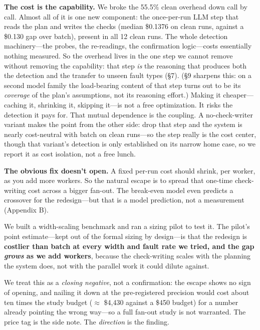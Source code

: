 \documentclass[acmsmall,screen]{acmart}
\begin{document}
\textbf{The cost is the capability.} We broke the 55.5\% clean overhead down
call by call. Almost all of it is one new component: the once-per-run LLM step
that reads the plan and writes the checks (median \$0.1376 on clean runs,
against a \$0.130 gap over batch), present in all 12 clean runs. The whole
detection machinery---the probes, the re-readings, the confirmation
logic---costs essentially nothing measured. So the overhead lives in the one
step we cannot remove without removing the capability: that step \emph{is} the
reasoning that produces both the detection and the transfer to unseen fault
types (\S7). (\S9 sharpens this: on a second model family the load-bearing content
of that step turns out to be its \emph{coverage} of the plan's assumptions, not
its reasoning effort.) Making it cheaper---caching it, shrinking it, skipping
it---is not a free optimization. It risks the detection it pays for. That mutual dependence is
the coupling. A no-check-writer variant makes the point from the other side:
drop that step and the system is nearly cost-neutral with batch on clean
runs---so the step really is the cost center, though that variant's detection is
only established on its narrow home case, so we report it as cost isolation, not
a free lunch.

\textbf{The obvious fix doesn't open.} A fixed per-run cost should shrink, per
worker, as you add more workers. So the natural escape is to spread that
one-time check-writing cost across a bigger fan-out. The break-even model even
predicts a crossover for the redesign---but that is a model prediction, not a
measurement (Appendix B).

We built a width-scaling benchmark and ran a sizing pilot to test it. The
pilot's point estimate---kept out of the formal sizing by design---is that the
redesign is \textbf{costlier than batch at every width and fault rate we tried,
and the gap \emph{grows} as we add workers}, because the check-writing scales
with the planning the system does, not with the parallel work it could dilute
against.

We treat this as a \emph{closing negative}, not a confirmation: the escape shows
no sign of opening, and nailing it down at the pre-registered precision would
cost about ten times the study budget ($\approx$ \$4,430 against a \$450 budget)
for a number already pointing the wrong way---so a full fan-out study is not
warranted. The price tag is the side note. The \emph{direction} is the finding.
\end{document}
